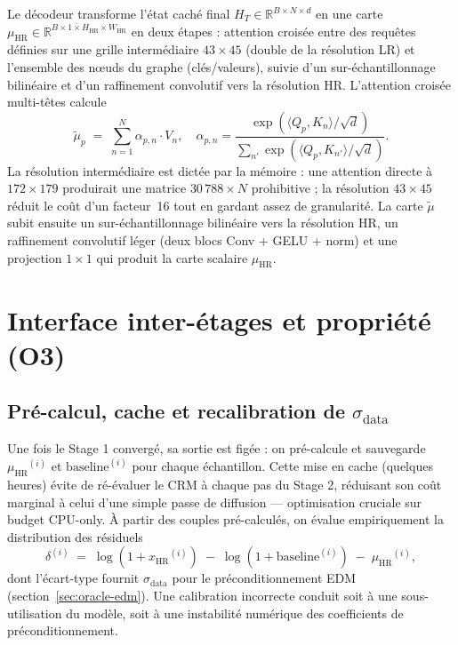 \documentclass[14pt,a4paper,openany]{extreport}
\theoremstyle{definition}
\newcommand{\HR}{\ensuremath{\text{HR}}}
\newcommand{\xHR}{\ensuremath{x_{\HR}}}
\newcommand{\muHR}{\ensuremath{\mu_{\HR}}}
\newcommand{\HT}{\ensuremath{H_T}}
\begin{document}
Le décodeur transforme l'état caché final $\HT \in \mathbb{R}^{B \times N \times d}$ en une carte $\muHR \in \mathbb{R}^{B \times 1 \times H_{\HR} \times W_{\HR}}$ en deux étapes : attention croisée entre des requêtes définies sur une grille intermédiaire $43 \times 45$ (double de la résolution LR) et l'ensemble des nœuds du graphe (clés/valeurs), suivie d'un sur-échantillonnage bilinéaire et d'un raffinement convolutif vers la résolution HR. L'attention croisée multi-têtes calcule
\begin{equation}
  \tilde{\mu}_p \;=\; \sum_{n=1}^{N} \alpha_{p,n} \cdot V_n,
  \quad
  \alpha_{p,n} = \frac{\exp\!\left( \langle Q_p, K_n \rangle / \sqrt{d} \right)}{\sum_{n'} \exp\!\left( \langle Q_p, K_{n'} \rangle / \sqrt{d} \right)}.
  \label{eq:cross-attention}
\end{equation}
La résolution intermédiaire est dictée par la mémoire : une attention directe à $172 \times 179$ produirait une matrice $30\,788 \times N$ prohibitive ; la résolution $43 \times 45$ réduit le coût d'un facteur~16 tout en gardant assez de granularité. La carte $\tilde{\mu}$ subit ensuite un sur-échantillonnage bilinéaire vers la résolution HR, un raffinement convolutif léger (deux blocs Conv + GELU + norm) et une projection $1 \times 1$ qui produit la carte scalaire $\muHR$.

\section{Interface inter-étages et propriété (O3)}
\label{sec:oracle-o3}

\subsection{Pré-calcul, cache et recalibration de $\sigma_{\mathrm{data}}$}
\label{ssec:oracle-cache}

Une fois le Stage 1 convergé, sa sortie est figée : on pré-calcule et sauvegarde $\muHR^{(i)}$ et $\mathrm{baseline}^{(i)}$ pour chaque échantillon. Cette mise en cache (quelques heures) évite de ré-évaluer le CRM à chaque pas du Stage 2, réduisant son coût marginal à celui d'une simple passe de diffusion — optimisation cruciale sur budget CPU-only. À partir des couples pré-calculés, on évalue empiriquement la distribution des résiduels
\begin{equation}
  \delta^{(i)} \;=\; \log(1 + \xHR^{(i)}) \;-\; \log(1 + \mathrm{baseline}^{(i)}) \;-\; \muHR^{(i)},
  \label{eq:residu}
\end{equation}
dont l'écart-type fournit $\sigma_{\mathrm{data}}$ pour le préconditionnement EDM (section~\ref{sec:oracle-edm}). Une calibration incorrecte conduit soit à une sous-utilisation du modèle, soit à une instabilité numérique des coefficients de préconditionnement.
\end{document}
